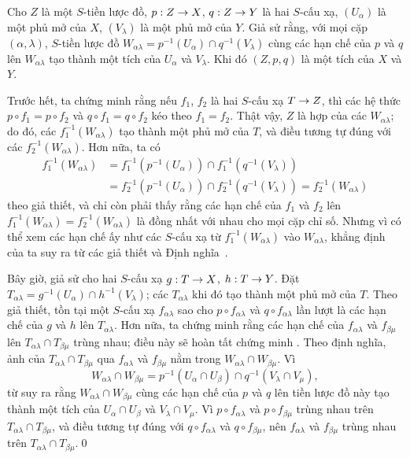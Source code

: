 \documentclass[oneside]{amsart}
\makeatletter
\newcommand{\ega@arrow}[2]{\mathchoice{#1}{#2}{#2}{#2}}
\renewcommand{\to}{\ega@arrow{\longrightarrow}{\rightarrow}}
\let\EGAOriginalLabel\label
\renewcommand{\label}[1]{\phantomsection\EGAOriginalLabel{#1}}
\makeatother
\begin{document}
\begin{lemma}[3.2.6.2]
\label{I.3.2.6.2}
Cho $Z$ là một $S$-tiền lược đồ, $p:Z\to X$, $q:Z\to Y$ là hai
$S$-cấu xạ, $(U_\alpha)$ là một phủ mở của $X$, $(V_\lambda)$ là một phủ mở
của $Y$. Giả sử rằng, với mọi cặp $(\alpha,\lambda)$, $S$-tiền lược đồ
$W_{\alpha\lambda}=p^{-1}(U_\alpha)\cap q^{-1}(V_\lambda)$ cùng các hạn chế
của $p$ và $q$ lên $W_{\alpha\lambda}$ tạo thành một tích của $U_\alpha$ và
$V_\lambda$. Khi đó $(Z,p,q)$ là một tích của $X$ và $Y$.
\end{lemma}

Trước hết, ta chứng minh rằng nếu $f_1$, $f_2$ là hai $S$-cấu xạ $T\to Z$,
thì các hệ thức $p\circ f_1=p\circ f_2$ và $q\circ f_1=q\circ f_2$ kéo theo
$f_1=f_2$. Thật vậy, $Z$ là hợp của các $W_{\alpha\lambda}$; do đó, các
$f_1^{-1}(W_{\alpha\lambda})$ tạo thành một phủ mở của $T$, và điều tương tự
đúng với các $f_2^{-1}(W_{\alpha\lambda})$. Hơn nữa, ta có
\[
\begin{aligned}
  f_1^{-1}(W_{\alpha\lambda})
  &=f_1^{-1}(p^{-1}(U_\alpha))\cap
    f_1^{-1}(q^{-1}(V_\lambda)) \\
  &=f_2^{-1}(p^{-1}(U_\alpha))\cap
    f_2^{-1}(q^{-1}(V_\lambda))
   =f_2^{-1}(W_{\alpha\lambda})
\end{aligned}
\]
theo giả thiết, và chỉ còn phải thấy rằng các hạn chế của $f_1$ và $f_2$ lên
$f_1^{-1}(W_{\alpha\lambda})=f_2^{-1}(W_{\alpha\lambda})$ là đồng nhất với
nhau cho mọi cặp chỉ số. Nhưng vì có thể xem các hạn chế ấy như các
$S$-cấu xạ từ $f_1^{-1}(W_{\alpha\lambda})$ vào $W_{\alpha\lambda}$, khẳng
định của ta suy ra từ các giả thiết và Định nghĩa~.

Bây giờ, giả sử cho hai $S$-cấu xạ $g:T\to X$, $h:T\to Y$. Đặt
$T_{\alpha\lambda}=g^{-1}(U_\alpha)\cap h^{-1}(V_\lambda)$; các
$T_{\alpha\lambda}$ khi đó tạo thành một phủ mở của $T$. Theo giả thiết, tồn
tại một $S$-cấu xạ $f_{\alpha\lambda}$ sao cho $p\circ f_{\alpha\lambda}$ và
$q\circ f_{\alpha\lambda}$ lần lượt là các hạn chế của $g$ và $h$ lên
$T_{\alpha\lambda}$. Hơn nữa, ta chứng minh rằng các hạn chế của
$f_{\alpha\lambda}$ và $f_{\beta\mu}$ lên
$T_{\alpha\lambda}\cap T_{\beta\mu}$ trùng nhau; điều này sẽ hoàn tất chứng
minh . Theo định nghĩa, ảnh của
$T_{\alpha\lambda}\cap T_{\beta\mu}$ qua $f_{\alpha\lambda}$ và
$f_{\beta\mu}$ nằm trong $W_{\alpha\lambda}\cap W_{\beta\mu}$. Vì
\[
  W_{\alpha\lambda}\cap W_{\beta\mu}
  =p^{-1}(U_\alpha\cap U_\beta)\cap
   q^{-1}(V_\lambda\cap V_\mu),
\]
từ  suy ra rằng
$W_{\alpha\lambda}\cap W_{\beta\mu}$ cùng các hạn chế của $p$ và $q$ lên
tiền lược đồ này tạo thành một tích của $U_\alpha\cap U_\beta$ và
$V_\lambda\cap V_\mu$. Vì $p\circ f_{\alpha\lambda}$ và
$p\circ f_{\beta\mu}$ trùng nhau trên
$T_{\alpha\lambda}\cap T_{\beta\mu}$, và điều tương tự đúng với
$q\circ f_{\alpha\lambda}$ và $q\circ f_{\beta\mu}$, nên
$f_{\alpha\lambda}$ và $f_{\beta\mu}$ trùng nhau trên
$T_{\alpha\lambda}\cap T_{\beta\mu}$.\qed
\end{document}
